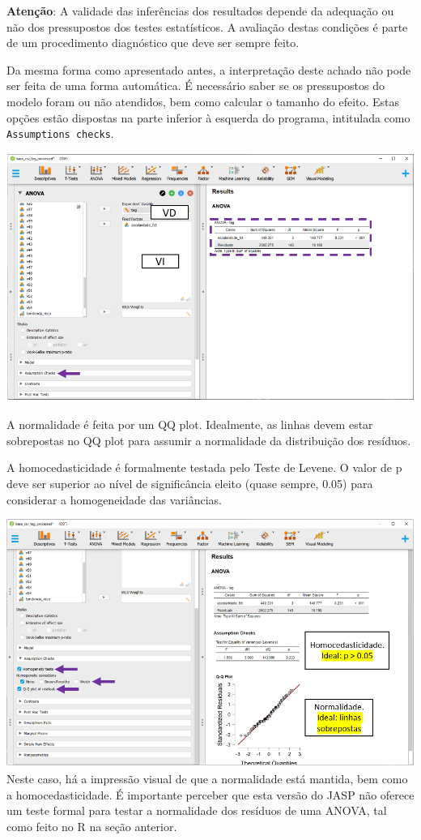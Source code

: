 \documentclass[
]{book}
\begin{document}
\textbf{Atenção}: A validade das inferências dos resultados depende da adequação ou não dos pressupostos dos testes estatísticos. A avaliação destas condições é parte de um procedimento diagnóstico que deve ser sempre feito.

Da mesma forma como apresentado antes, a interpretação deste achado não pode ser feita de uma forma automática. É necessário saber se os pressupostos do modelo foram ou não atendidos, bem como calcular o tamanho do efeito. Estas opções estão dispostas na parte inferior à esquerda do programa, intitulada como \texttt{Assumptions\ checks}.

\includegraphics{./img/cap_anova_assumptions.png}

A normalidade é feita por um QQ plot. Idealmente, as linhas devem estar sobrepostas no QQ plot para assumir a normalidade da distribuição dos resíduos.

A homocedasticidade é formalmente testada pelo Teste de Levene. O valor de p deve ser superior ao nível de significância eleito (quase sempre, 0.05) para considerar a homogeneidade das variâncias.

\includegraphics{./img/cap_anova_assumptions2.png}
Neste caso, há a impressão visual de que a normalidade está mantida, bem como a homocedasticidade. É importante perceber que esta versão do JASP não oferece um teste formal para testar a normalidade dos resíduos de uma ANOVA, tal como feito no R na seção anterior.
\end{document}
